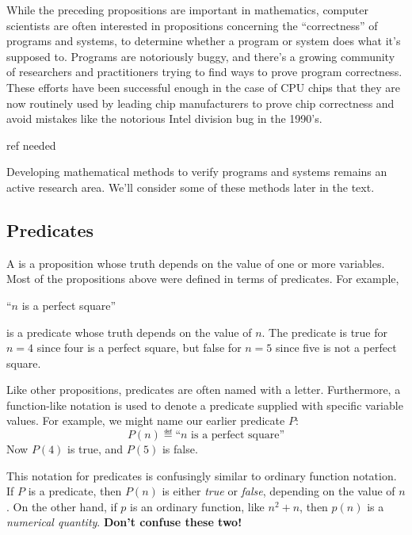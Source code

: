While the preceding propositions are important in mathematics,
computer scientists are often interested in propositions concerning
the ``correctness'' of programs and systems, to determine whether a
program or system does what it's supposed to.  Programs are
notoriously buggy, and there's a growing community of researchers and
practitioners trying to find ways to prove program correctness.  These
efforts have been successful enough in the case of CPU chips that they
are now routinely used by leading chip manufacturers to prove chip
correctness and avoid mistakes like the notorious Intel division bug
in the 1990's.
\begin{editingnotes}
ref needed
\end{editingnotes}

Developing mathematical methods to verify programs and systems remains an
active research area.  We'll consider some of these methods later in the
text.

\subsection{Predicates}
A  is a proposition whose truth depends on the value of
one or more variables.  Most of the propositions above were defined in
terms of predicates.  For example,
%
\begin{center}
``$n$ is a perfect square''
\end{center}
%
is a predicate whose truth depends on the value of $n$.  The predicate is
true for $n = 4$ since four is a perfect square, but false for $n = 5$
since five is not a perfect square.  

Like other propositions, predicates are often named with a letter.
Furthermore, a function-like notation is used to denote a predicate
supplied with specific variable values.  For example, we might name
our earlier predicate $P$:
%
\[
P(n) \eqdef \text{``$n$ is a perfect square''}
\]
%
Now $P(4)$ is true, and $P(5)$ is false.

This notation for predicates is confusingly similar to ordinary function
notation.  If $P$ is a predicate, then $P(n)$ is either \textit{true} or
\textit{false}, depending on the value of $n$.  On the other hand, if $p$
is an ordinary function, like $n^2 + n$, then $p(n)$ is a
\textit{numerical quantity}.  \textbf{Don't confuse these two!}

\newcommand{\solves}{\text{Solves}}
\newcommand{\probs}{\text{Probs}}
\newcommand{\even}{\text{Evens}}
\newcommand{\primes}{\text{Primes}}

